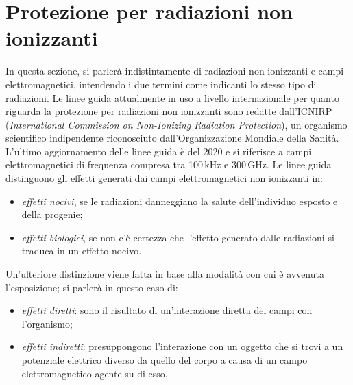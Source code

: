 \documentclass{report}
\numberwithin{equation}{section}
\numberwithin{figure}{section}
\begin{document}
\section{Protezione per radiazioni non ionizzanti}
In questa sezione, si parlerà indistintamente di radiazioni non ionizzanti e campi elettromagnetici, intendendo i due termini come indicanti lo stesso tipo di radiazioni. Le linee guida attualmente in uso a livello internazionale per quanto riguarda la protezione per radiazioni non ionizzanti sono redatte dall'ICNIRP (\textit{International Commission on Non-Ionizing Radiation Protection}), un organismo scientifico indipendente riconosciuto dall'Organizzazione Mondiale della Sanità. L'ultimo aggiornamento delle linee guida è del 2020 e si riferisce a campi elettromagnetici di frequenza compresa tra 100\,kHz e 300\,GHz. Le linee guida distinguono gli effetti generati dai campi elettromagnetici non ionizzanti in:
\begin{itemize}[label=$-$]
    \item \textit{effetti nocivi}, se le radiazioni danneggiano la salute dell'individuo esposto e della progenie;
    \item \textit{effetti biologici}, se non c'è certezza che l'effetto generato dalle radiazioni si traduca in un effetto nocivo.
\end{itemize}
Un'ulteriore distinzione viene fatta in base alla modalità con cui è avvenuta l'esposizione; si parlerà in questo caso di:
\begin{itemize}[label=$-$]
    \item \textit{effetti diretti}: sono il risultato di un'interazione diretta dei campi con l'organismo;
    \item \textit{effetti indiretti}: presuppongono l'interazione con un oggetto che si trovi a un potenziale elettrico diverso da quello del corpo a causa di un campo elettromagnetico agente su di esso.
\end{itemize}
\end{document}
